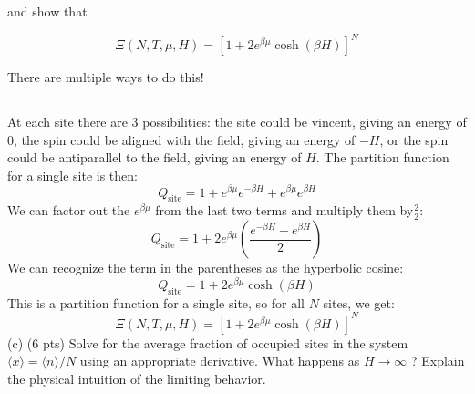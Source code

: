 \documentclass[12pt]{article}
\begin{document}
and show that

$$
\Xi(N, T, \mu, H)=\left[1+2 e^{\beta \mu} \cosh (\beta H)\right]^{N}
$$

There are multiple ways to do this!
\subsection{}
At each site there are 3 possibilities: the site could be vincent, giving an energy of 0, the spin could be aligned with the field, giving an energy of $-H$, or the spin could be antiparallel to the field, giving an energy of $H$. The partition function for a single site is then:
\begin{equation}
  Q_{\text{site}} = 1 + e^{\beta \mu} e^{-\beta H} + e^{\beta \mu} e^{\beta H}
\end{equation}
We can factor out the $e^{\beta \mu}$ from the last two terms and multiply them by$\frac{2}{2}$:
\begin{equation}
  Q_{\text{site}} = 1 + 2 e^{\beta \mu}\left( \frac{e^{-\beta H} + e^{\beta H}}{2} \right)
\end{equation}
We can recognize the term in the parentheses as the hyperbolic cosine:
\begin{equation}
  Q_{\text{site}} = 1 + 2 e^{\beta \mu} \cosh(\beta H)
\end{equation}
This is a partition function for a single site, so for all $N$ sites, we get:
\begin{equation}
  \Xi(N, T, \mu, H) = \left[1 + 2 e^{\beta \mu} \cosh(\beta H) \right]^N
\end{equation}
(c) (6 pts) Solve for the average fraction of occupied sites in the system $\langle x\rangle=\langle n\rangle / N$ using an appropriate derivative. What happens as $H \rightarrow \infty$ ? Explain the physical intuition of the limiting behavior.
\end{document}
